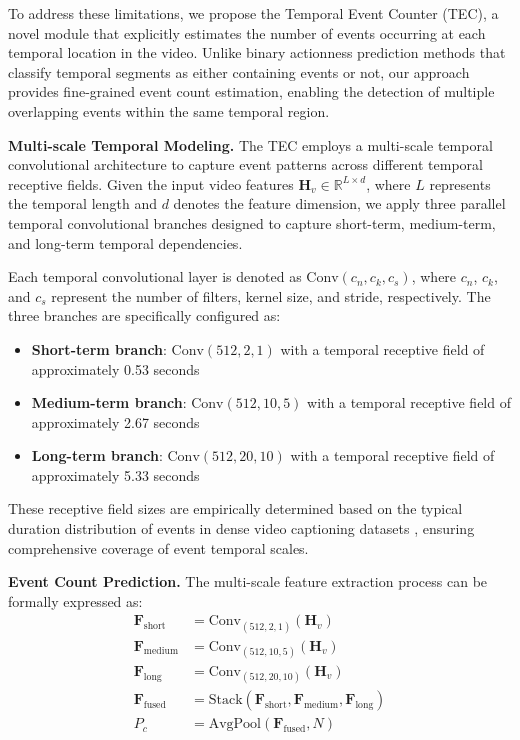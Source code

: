 To address these limitations, we propose the Temporal Event Counter (TEC), a novel module that explicitly estimates the number of events occurring at each temporal location in the video. Unlike binary actionness prediction methods \cite{lin2018bsn,buch2017sst} that classify temporal segments as either containing events or not, our approach provides fine-grained event count estimation, enabling the detection of multiple overlapping events within the same temporal region.

\textbf{Multi-scale Temporal Modeling.}
The TEC employs a multi-scale temporal convolutional architecture to capture event patterns across different temporal receptive fields. Given the input video features $\mathbf{H}_v \in \mathbb{R}^{L \times d}$, where $L$ represents the temporal length and $d$ denotes the feature dimension, we apply three parallel temporal convolutional branches designed to capture short-term, medium-term, and long-term temporal dependencies.

Each temporal convolutional layer is denoted as $\text{Conv}(c_n, c_k, c_s)$, where $c_n$, $c_k$, and $c_s$ represent the number of filters, kernel size, and stride, respectively. The three branches are specifically configured as:
\begin{itemize}
    \item \textbf{Short-term branch}: $\text{Conv}(512, 2, 1)$ with a temporal receptive field of approximately 0.53 seconds
    \item \textbf{Medium-term branch}: $\text{Conv}(512, 10, 5)$ with a temporal receptive field of approximately 2.67 seconds  
    \item \textbf{Long-term branch}: $\text{Conv}(512, 20, 10)$ with a temporal receptive field of approximately 5.33 seconds
\end{itemize}

These receptive field sizes are empirically determined based on the typical duration distribution of events in dense video captioning datasets \cite{Krishna2017-pw,Zhou2018-eq}, ensuring comprehensive coverage of event temporal scales.

\textbf{Event Count Prediction.}
The multi-scale feature extraction process can be formally expressed as:
\begin{align}
  \mathbf{F}_{\text{short}} &= \text{Conv}_{(512, 2, 1)} (\mathbf{H}_v) \\
  \mathbf{F}_{\text{medium}} &= \text{Conv}_{(512, 10, 5)} (\mathbf{H}_v) \\
  \mathbf{F}_{\text{long}} &= \text{Conv}_{(512, 20, 10)} (\mathbf{H}_v) \\
  \mathbf{F}_{\text{fused}} &= \text{Stack}(\mathbf{F}_{\text{short}}, \mathbf{F}_{\text{medium}}, \mathbf{F}_{\text{long}}) \\
  P_c &= \text{AvgPool}(\mathbf{F}_{\text{fused}}, N)
\end{align}

